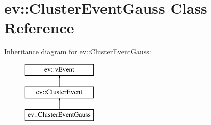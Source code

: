 \hypertarget{classev_1_1ClusterEventGauss}{}\section{ev\+:\+:Cluster\+Event\+Gauss Class Reference}
\label{classev_1_1ClusterEventGauss}
Inheritance diagram for ev\+:\+:Cluster\+Event\+Gauss\+:\begin{figure}[H]
\begin{center}
\leavevmode
\includegraphics[height=3.000000cm]{classev_1_1ClusterEventGauss}
\end{center}
\end{figure}
